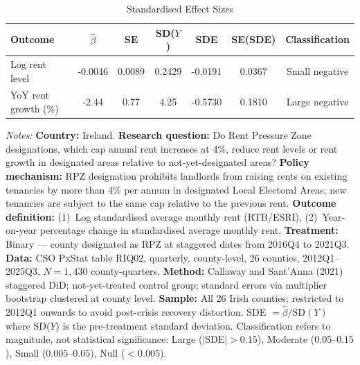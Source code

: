 \begin{table}[t]
\centering
\caption{Standardised Effect Sizes}
\label{tab:sde}
\begin{tabular}{lcccccc}
\toprule
Outcome & $\hat{\beta}$ & SE & SD($Y$) & SDE & SE(SDE) & Classification \\
\midrule
Log rent level & -0.0046 & 0.0089 & 0.2429 & -0.0191 & 0.0367 & Small negative \\
YoY rent growth (\%) & -2.44 & 0.77 & 4.25 & -0.5730 & 0.1810 & Large negative \\
\bottomrule
\end{tabular}
\par\vspace{0.3em}\begin{minipage}{\textwidth}\footnotesize
\textit{Notes:} \textbf{Country:} Ireland. \textbf{Research question:} Do Rent Pressure Zone designations, which cap annual rent increases at 4\%, reduce rent levels or rent growth in designated areas relative to not-yet-designated areas? \textbf{Policy mechanism:} RPZ designation prohibits landlords from raising rents on existing tenancies by more than 4\% per annum in designated Local Electoral Areas; new tenancies are subject to the same cap relative to the previous rent. \textbf{Outcome definition:} (1)~Log standardised average monthly rent (RTB/ESRI), (2)~Year-on-year percentage change in standardised average monthly rent. \textbf{Treatment:} Binary --- county designated as RPZ at staggered dates from 2016Q4 to 2021Q3. \textbf{Data:} CSO PxStat table RIQ02, quarterly, county-level, 26 counties, 2012Q1--2025Q3, $N = 1{,}430$ county-quarters. \textbf{Method:} Callaway and Sant'Anna (2021) staggered DiD; not-yet-treated control group; standard errors via multiplier bootstrap clustered at county level. \textbf{Sample:} All 26 Irish counties; restricted to 2012Q1 onwards to avoid post-crisis recovery distortion. SDE $= \hat{\beta} / \text{SD}(Y)$ where SD($Y$) is the pre-treatment standard deviation. Classification refers to magnitude, not statistical significance: Large ($|$SDE$| > 0.15$), Moderate ($0.05$--$0.15$), Small ($0.005$--$0.05$), Null ($< 0.005$).
\end{minipage}
\end{table}

